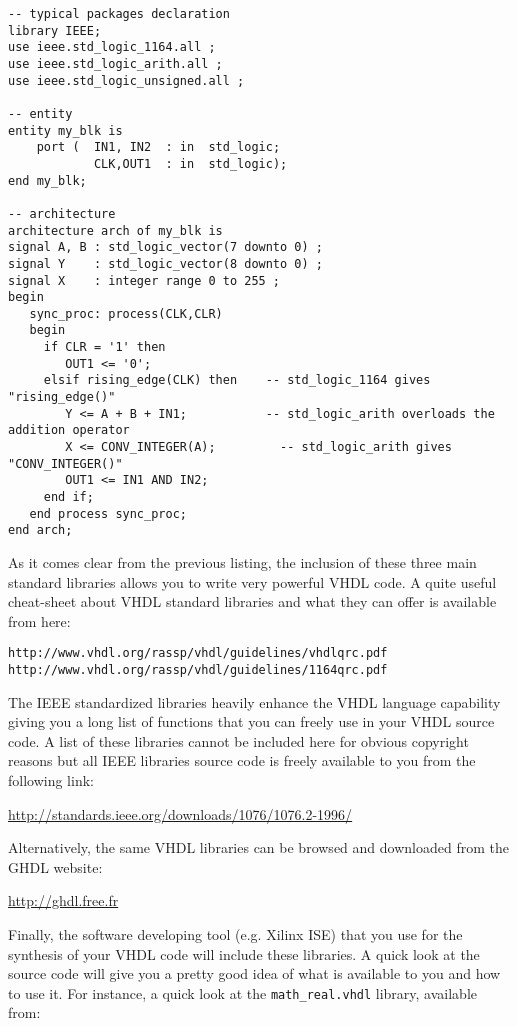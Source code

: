 \begin{lstlisting}[caption=Example of operators and types available with some IEEE packages.]
-- typical packages declaration
library IEEE;
use ieee.std_logic_1164.all ;
use ieee.std_logic_arith.all ;
use ieee.std_logic_unsigned.all ;

-- entity
entity my_blk is 
    port (  IN1, IN2  : in  std_logic; 
            CLK,OUT1  : in  std_logic); 
end my_blk;

-- architecture
architecture arch of my_blk is
signal A, B : std_logic_vector(7 downto 0) ;
signal Y    : std_logic_vector(8 downto 0) ;
signal X    : integer range 0 to 255 ;
begin
   sync_proc: process(CLK,CLR)
   begin
     if CLR = '1' then 
        OUT1 <= '0';  
     elsif rising_edge(CLK) then    -- std_logic_1164 gives "rising_edge()"
        Y <= A + B + IN1;           -- std_logic_arith overloads the addition operator
        X <= CONV_INTEGER(A);         -- std_logic_arith gives "CONV_INTEGER()"
        OUT1 <= IN1 AND IN2; 
     end if; 
   end process sync_proc; 
end arch;
\end{lstlisting}
As it comes clear from the previous listing, the inclusion of these three main standard libraries allows you to write very powerful VHDL code. A quite useful cheat-sheet about VHDL standard libraries and what they can offer is available from here:
\begin{verbatim}
http://www.vhdl.org/rassp/vhdl/guidelines/vhdlqrc.pdf
http://www.vhdl.org/rassp/vhdl/guidelines/1164qrc.pdf
\end{verbatim}

The IEEE standardized libraries heavily enhance the VHDL language capability giving you a long list of functions that you can freely use in your VHDL source code. A list of these libraries cannot be included here for obvious copyright reasons but all IEEE libraries source code is freely available to you from the following link:

\url{http://standards.ieee.org/downloads/1076/1076.2-1996/}

Alternatively, the same VHDL libraries can be browsed and downloaded from the GHDL website:

\url{http://ghdl.free.fr}

Finally, the software developing tool (e.g. Xilinx ISE) that you use for the synthesis of your VHDL code will include these libraries. A quick look at the source code will give you a pretty good idea of what is available to you and how to use it. For instance, a quick look at the \texttt{math\_real.vhdl} library, available from: 

